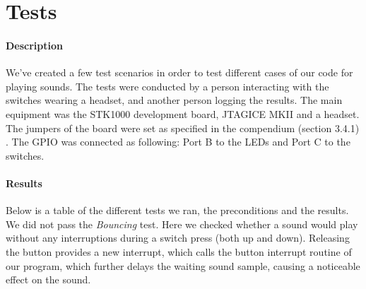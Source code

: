 \documentclass[a4paper,11pt]{article}
\begin{document}
\section{Tests}
\paragraph{Description}
We've created a few test scenarios in order to test different cases of our code for playing sounds. The tests were conducted by a person interacting with the switches wearing a headset, and another person logging the results. The main equipment was the STK1000 development board, JTAGICE MKII and a headset. The jumpers of the board were set as specified in the compendium (section 3.4.1) \cite{komp}. The GPIO was connected as following: Port B to the LEDs and Port C to the switches.

\paragraph{Results}
Below is a table of the different tests we ran, the preconditions and the results. We did not pass the \emph{Bouncing} test. Here we checked whether a sound would play without any interruptions during a switch press (both up and down). Releasing the button provides a new interrupt, which calls the button interrupt routine of our program, which further delays the waiting sound sample, causing a noticeable effect on the sound.
\end{document}
